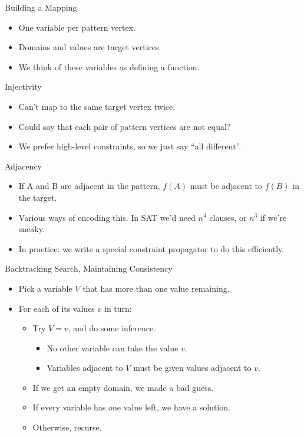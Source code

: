 \documentclass[aspectratio=169,compress,10pt]{beamer}
\begin{document}
\begin{frame}{Building a Mapping}
    \begin{itemize}
        \item One variable per pattern vertex.
        \item Domains and values are target vertices.
        \item We think of these variables as defining a function.
    \end{itemize}
\end{frame}

\begin{frame}{Injectivity}
    \begin{itemize}
        \item Can't map to the same target vertex twice.
        \item Could say that each pair of pattern vertices are not equal?
        \item <2-> We prefer high-level constraints, so we just say ``all different''.
    \end{itemize}
\end{frame}

\begin{frame}{Adjacency}
    \begin{itemize}
        \item If A and B are adjacent in the pattern, $f(A)$ must be adjacent to $f(B)$
            in the target.
        \item Various ways of encoding this. In SAT we'd need $n^4$ clauses, or $n^3$ if
            we're sneaky.
        \item In practice: we write a special constraint propagator to do this efficiently.
    \end{itemize}
\end{frame}

\begin{frame}{Backtracking Search, Maintaining Consistency}
    \begin{itemize}
        \item Pick a variable $V$ that has more than one value remaining.
        \item For each of its values $v$ in turn:
            \begin{itemize}
                \item Try $V = v$, and do some inference.
                    \begin{itemize}
                        \item No other variable can take the value $v$.
                        \item Variables adjacent to $V$ must be given values adjacent to $v$.
                    \end{itemize}
                \item If we get an empty domain, we made a bad guess.
                \item If every variable has one value left, we have a solution.
                \item Otherwise, recurse.
            \end{itemize}
    \end{itemize}
\end{frame}
\end{document}
